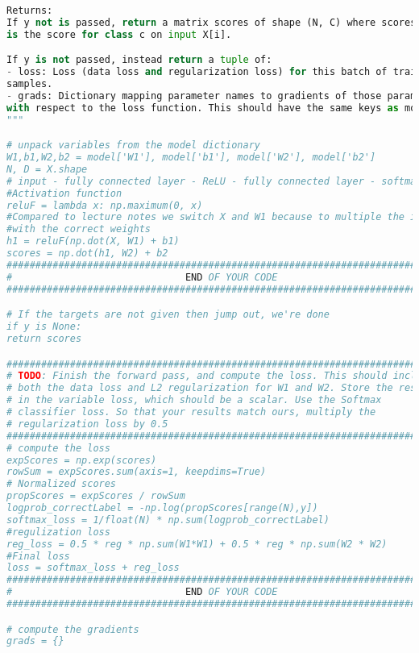 \begin{lstlisting}[language=Python, label=lst:neuralnet.py, caption={neural\_net.py}, basicstyle=\tiny]
Returns:
If y not is passed, return a matrix scores of shape (N, C) where scores[i, c]
is the score for class c on input X[i].

If y is not passed, instead return a tuple of:
- loss: Loss (data loss and regularization loss) for this batch of training
samples.
- grads: Dictionary mapping parameter names to gradients of those parameters
with respect to the loss function. This should have the same keys as model.
"""

# unpack variables from the model dictionary
W1,b1,W2,b2 = model['W1'], model['b1'], model['W2'], model['b2']
N, D = X.shape  
# input - fully connected layer - ReLU - fully connected layer - softmax
#Activation function
reluF = lambda x: np.maximum(0, x)
#Compared to lecture notes we switch X and W1 because to multiple the inputs 
#with the correct weights
h1 = reluF(np.dot(X, W1) + b1)
scores = np.dot(h1, W2) + b2
#############################################################################
#                              END OF YOUR CODE                             #
#############################################################################

# If the targets are not given then jump out, we're done
if y is None:
return scores

#############################################################################
# TODO: Finish the forward pass, and compute the loss. This should include  #
# both the data loss and L2 regularization for W1 and W2. Store the result  #
# in the variable loss, which should be a scalar. Use the Softmax           #
# classifier loss. So that your results match ours, multiply the            #
# regularization loss by 0.5                                                #
#############################################################################
# compute the loss
expScores = np.exp(scores)
rowSum = expScores.sum(axis=1, keepdims=True)
# Normalized scores
propScores = expScores / rowSum
logprob_correctLabel = -np.log(propScores[range(N),y])
softmax_loss = 1/float(N) * np.sum(logprob_correctLabel)
#regulization loss
reg_loss = 0.5 * reg * np.sum(W1*W1) + 0.5 * reg * np.sum(W2 * W2)
#Final loss 
loss = softmax_loss + reg_loss
#############################################################################
#                              END OF YOUR CODE                             #
#############################################################################

# compute the gradients
grads = {}


\end{lstlisting}
